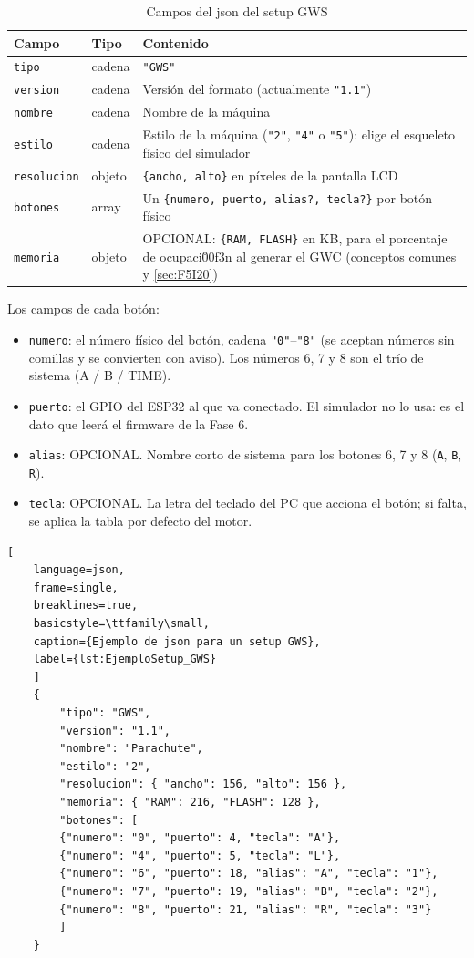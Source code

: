 \begin{table}[H]
	\centering
	\begin{tabular}{llp{10cm}}
		\toprule
		Campo & Tipo & Contenido \\
		\midrule
		\texttt{tipo} & cadena & \texttt{"GWS"}\footnotemark \\
		\texttt{version} & cadena & Versión del formato (actualmente \texttt{"1.1"}) \\
		\texttt{nombre} & cadena & Nombre de la máquina \\
		\texttt{estilo} & cadena & Estilo de la máquina (\texttt{"2"}, \texttt{"4"} o \texttt{"5"}): elige el esqueleto físico del simulador \\
		\texttt{resolucion} & objeto & \texttt{\{ancho, alto\}} en píxeles de la pantalla LCD \\
		\texttt{botones} & array & Un \texttt{\{numero, puerto, alias?, tecla?\}} por botón físico \\
		\texttt{memoria} & objeto & OPCIONAL: \texttt{\{RAM, FLASH\}} en KB, para el porcentaje de ocupaci\u00f3n al generar el GWC (conceptos comunes y \ref{sec:F5I20}) \\
		\bottomrule
	\end{tabular}
	\caption{Campos del json del setup GWS}
	\label{tab:F1A01GWS}
\end{table}


Los campos de cada botón:

\begin{itemize}
	\item \texttt{numero}: el número físico del botón, cadena
	\texttt{"0"}--\texttt{"8"} (se aceptan números sin comillas y se
	convierten con aviso). Los números 6, 7 y 8 son el trío de sistema
	(A / B / TIME).
	\item \texttt{puerto}: el GPIO del ESP32 al que va conectado. El
	simulador no lo usa: es el dato que leerá el firmware de la Fase 6.
	\item \texttt{alias}: OPCIONAL. Nombre corto de sistema para los
	botones 6, 7 y 8 (\texttt{A}, \texttt{B}, \texttt{R}).
	\item \texttt{tecla}: OPCIONAL. La letra del teclado del PC que
	acciona el botón; si falta, se aplica la tabla por defecto del
	motor.
\end{itemize}

\begin{lstlisting}[
	language=json, 
	frame=single, 
	breaklines=true, 
	basicstyle=\ttfamily\small,
	caption={Ejemplo de json para un setup GWS},
	label={lst:EjemploSetup_GWS}
	]
	{
		"tipo": "GWS",
		"version": "1.1",
		"nombre": "Parachute",
		"estilo": "2",
		"resolucion": { "ancho": 156, "alto": 156 },
		"memoria": { "RAM": 216, "FLASH": 128 },
		"botones": [
		{"numero": "0", "puerto": 4, "tecla": "A"},
		{"numero": "4", "puerto": 5, "tecla": "L"},
		{"numero": "6", "puerto": 18, "alias": "A", "tecla": "1"},
		{"numero": "7", "puerto": 19, "alias": "B", "tecla": "2"},
		{"numero": "8", "puerto": 21, "alias": "R", "tecla": "3"}
		]
	}
\end{lstlisting}

